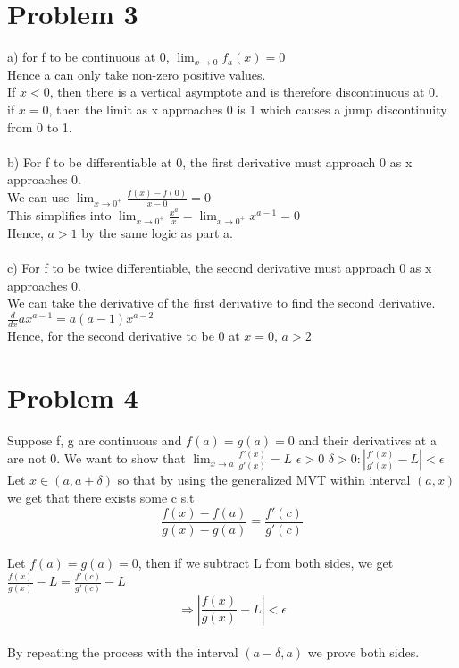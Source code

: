 \documentclass{article}
\begin{document}
\section*{Problem 3}
a) for f to be continuous at 0, $\lim_{x \to 0} f_a(x) = 0$
\\Hence a can only take non-zero positive values.
\\If $x < 0$, then there is a vertical asymptote and is therefore discontinuous at 0.
\\if $x = 0$, then the limit as x approaches 0 is 1 which causes a jump discontinuity from 0 to 1.
\\
\\b) For f to be differentiable at 0, the first derivative must approach 0 as x approaches 0.
\\We can use $\lim_{x \to 0^+}\frac{f(x) - f(0)}{x - 0} = 0$
\\This simplifies into $\lim_{x \to 0^+}\frac{x^a}{x} = \lim_{x \to 0^+} x^{a - 1} = 0$
\\Hence, $a > 1$ by the same logic as part a.
\\
\\c) For f to be twice differentiable, the second derivative must approach 0 as x approaches 0.
\\We can take the derivative of the first derivative to find the second derivative. $\frac{d}{dx}ax^{a-1} = a(a-1)x^{a-2}$
\\Hence, for the second derivative to be 0 at $x = 0$, $a > 2$

\section*{Problem 4}
Suppose f, g are continuous and $f(a) = g(a) = 0$ and their derivatives at a are not 0.
We want to show that $\lim_{x \to a} \frac{f'(x)}{g'(x)} = L$
$\epsilon > 0$ $\delta > 0 : |\frac{f'(x)}{g'(x)} - L| < \epsilon$
\\Let $x \in (a, a+\delta)$ so that by using the generalized MVT within interval $(a, x)$ we get that there exists some c s.t $$\frac{f(x) - f(a)}{g(x)-g(a)} = \frac{f'(c)}{g'(c)}$$
\\Let $f(a) = g(a) = 0$, then if we subtract L from both sides, we get $\frac{f(x)}{g(x)} - L = \frac{f'(c)}{g'(c)} - L$
$$\Rightarrow |\frac{f(x)}{g(x)} - L| < \epsilon$$
\\By repeating the process with the interval $(a - \delta, a)$ we prove both sides.
\end{document}
